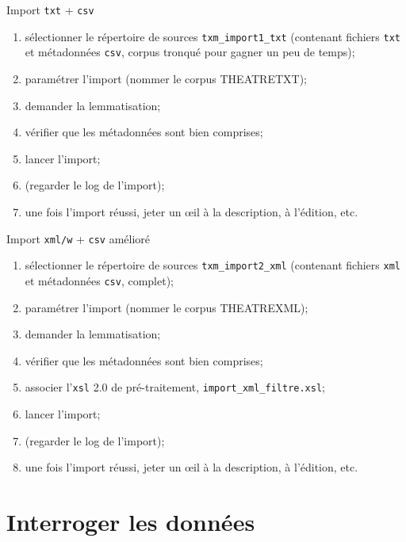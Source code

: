 \documentclass{beamer}
\begin{document}
\begin{frame}{Import \texttt{txt} + \texttt{csv}}
	
	\begin{enumerate}
		\item sélectionner le répertoire de sources \texttt{txm\_import1\_txt} (contenant fichiers \texttt{txt} et métadonnées \texttt{csv},
		corpus tronqué pour gagner un peu de temps);
		\item paramétrer l'import (nommer le corpus THEATRETXT);
		\item demander la lemmatisation;
		\item vérifier que les métadonnées sont bien comprises;
		\item lancer l'import;
		\item (regarder le log de l'import);
		\item une fois l'import réussi, jeter un œil à la description, à l'édition, etc.
	\end{enumerate}
	
\end{frame}


\begin{frame}{Import \texttt{xml/w} + \texttt{csv} amélioré}

\begin{enumerate}
	\item sélectionner le répertoire de sources \texttt{txm\_import2\_xml} (contenant fichiers \texttt{xml} et métadonnées \texttt{csv},
complet);
	\item paramétrer l'import (nommer le corpus THEATREXML);
	\item demander la lemmatisation;
	\item vérifier que les métadonnées sont bien comprises;
	\item \alert{associer l'\texttt{xsl} 2.0 de pré-traitement, \texttt{import\_xml\_filtre.xsl}};
	\item lancer l'import;
	\item (regarder le log de l'import);
	\item une fois l'import réussi, jeter un œil à la description, à l'édition, etc.
\end{enumerate}

\end{frame}


\section{Interroger les données}
\end{document}
